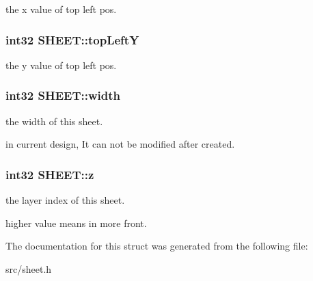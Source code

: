 the x value of top left pos. 

\hypertarget{struct_s_h_e_e_t_a21ffe33973d8fbc628ad4e5661abc6a2}{}
\subsubsection[{top\+Left\+Y}]{\setlength{\rightskip}{0pt plus 5cm}int32 S\+H\+E\+E\+T\+::top\+Left\+Y}\label{struct_s_h_e_e_t_a21ffe33973d8fbc628ad4e5661abc6a2}


the y value of top left pos. 

\hypertarget{struct_s_h_e_e_t_a5f348f86097b8a7118f837fe5fb8896a}{}
\subsubsection[{width}]{\setlength{\rightskip}{0pt plus 5cm}int32 S\+H\+E\+E\+T\+::width}\label{struct_s_h_e_e_t_a5f348f86097b8a7118f837fe5fb8896a}


the width of this sheet. 

in current design, It can not be modified after created. \hypertarget{struct_s_h_e_e_t_a610f3c03219d584d4d27802b03794084}{}
\subsubsection[{z}]{\setlength{\rightskip}{0pt plus 5cm}int32 S\+H\+E\+E\+T\+::z}\label{struct_s_h_e_e_t_a610f3c03219d584d4d27802b03794084}


the layer index of this sheet. 

higher value means in more front. 

The documentation for this struct was generated from the following file\+:\begin{DoxyCompactItemize}
\item 
src/sheet.\+h\end{DoxyCompactItemize}
